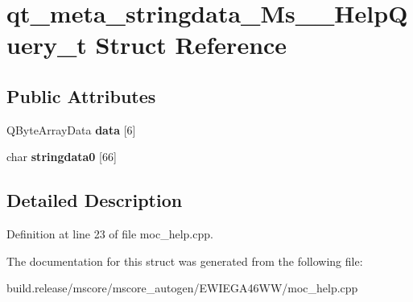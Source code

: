 \hypertarget{structqt__meta__stringdata___ms_____help_query__t}{}\section{qt\+\_\+meta\+\_\+stringdata\+\_\+\+Ms\+\_\+\+\_\+\+Help\+Query\+\_\+t Struct Reference}
\label{structqt__meta__stringdata___ms_____help_query__t}
\subsection*{Public Attributes}
\begin{DoxyCompactItemize}
\item 
\mbox{\label{structqt__meta__stringdata___ms_____help_query__t_aee7268edb216a7471099b5a06d4fa309}} 
Q\+Byte\+Array\+Data {\bfseries data} \mbox{[}6\mbox{]}
\item 
\mbox{\label{structqt__meta__stringdata___ms_____help_query__t_a1c45de740fd98bec44b353528396b7a5}} 
char {\bfseries stringdata0} \mbox{[}66\mbox{]}
\end{DoxyCompactItemize}


\subsection{Detailed Description}


Definition at line 23 of file moc\+\_\+help.\+cpp.



The documentation for this struct was generated from the following file\+:\begin{DoxyCompactItemize}
\item 
build.\+release/mscore/mscore\+\_\+autogen/\+E\+W\+I\+E\+G\+A46\+W\+W/moc\+\_\+help.\+cpp\end{DoxyCompactItemize}
